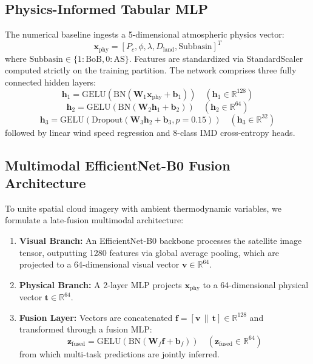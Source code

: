 \documentclass[conference]{IEEEtran}
\begin{document}
\subsection{Physics-Informed Tabular MLP}
The numerical baseline ingests a 5-dimensional atmospheric physics vector:
\begin{equation}
    \mathbf{x}_{\text{phy}} = [P_c, \phi, \lambda, D_{\text{land}}, \text{Subbasin}]^T
\end{equation}
where $\text{Subbasin} \in \{1: \text{BoB}, 0: \text{AS}\}$. Features are standardized via StandardScaler computed strictly on the training partition. The network comprises three fully connected hidden layers:
\begin{equation}
    \mathbf{h}_1 = \text{GELU}(\text{BN}(\mathbf{W}_1 \mathbf{x}_{\text{phy}} + \mathbf{b}_1)) \quad (\mathbf{h}_1 \in \mathbb{R}^{128})
\end{equation}
\begin{equation}
    \mathbf{h}_2 = \text{GELU}(\text{BN}(\mathbf{W}_2 \mathbf{h}_1 + \mathbf{b}_2)) \quad (\mathbf{h}_2 \in \mathbb{R}^{64})
\end{equation}
\begin{equation}
    \mathbf{h}_3 = \text{GELU}(\text{Dropout}(\mathbf{W}_3 \mathbf{h}_2 + \mathbf{b}_3, p=0.15)) \quad (\mathbf{h}_3 \in \mathbb{R}^{32})
\end{equation}
followed by linear wind speed regression and 8-class IMD cross-entropy heads.

\subsection{Multimodal EfficientNet-B0 Fusion Architecture}
To unite spatial cloud imagery with ambient thermodynamic variables, we formulate a late-fusion multimodal architecture:
\begin{enumerate}
    \item \textbf{Visual Branch:} An EfficientNet-B0 backbone processes the satellite image tensor, outputting 1280 features via global average pooling, which are projected to a 64-dimensional visual vector $\mathbf{v} \in \mathbb{R}^{64}$.
    \item \textbf{Physical Branch:} A 2-layer MLP projects $\mathbf{x}_{\text{phy}}$ to a 64-dimensional physical vector $\mathbf{t} \in \mathbb{R}^{64}$.
    \item \textbf{Fusion Layer:} Vectors are concatenated $\mathbf{f} = [\mathbf{v} \,\|\, \mathbf{t}] \in \mathbb{R}^{128}$ and transformed through a fusion MLP:
    \begin{equation}
        \mathbf{z}_{\text{fused}} = \text{GELU}(\text{BN}(\mathbf{W}_f \mathbf{f} + \mathbf{b}_f)) \quad (\mathbf{z}_{\text{fused}} \in \mathbb{R}^{64})
    \end{equation}
    from which multi-task predictions are jointly inferred.
\end{enumerate}
\end{document}
